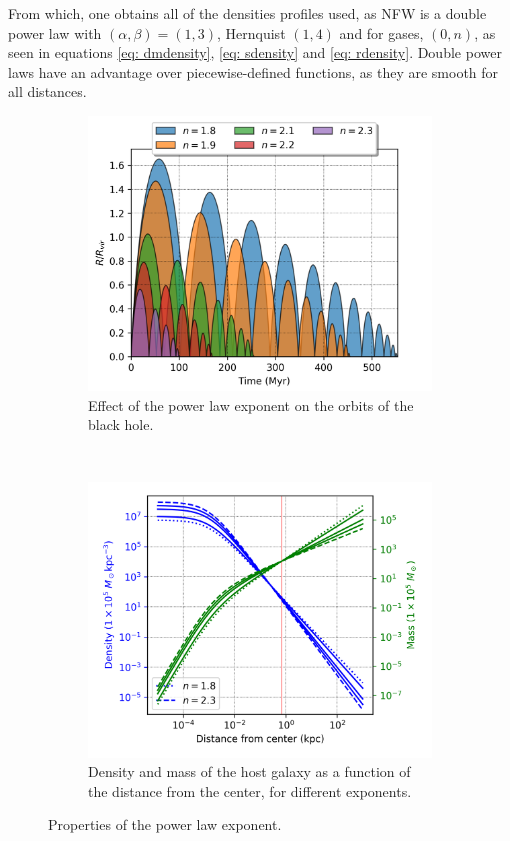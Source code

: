 		From which, one obtains all of the densities profiles used, as NFW is a double power law with $(\alpha, \beta) = (1, 3)$, Hernquist $(1, 4)$ and for gases, $(0, n)$, as seen in equations \ref{eq: dmdensity}, \ref{eq: sdensity} and \ref{eq: rdensity}. Double power laws have an advantage over piecewise-defined functions, as they are smooth for all distances. 		
		\begin{figure}[h]
			\centering
			\begin{subfigure}[t]{0.49\textwidth}
				\includegraphics[width = \textwidth]{"../Files/Week 6/power_law"}
				\caption{Effect of the power law exponent on the orbits of the black hole.}
				\label{fig: powerLawOrbits}
			\end{subfigure}
			~ 
			\begin{subfigure}[t]{0.49\textwidth}
				\includegraphics[width=\textwidth]{"../Files/Week 6/power_law_density"}
				\caption{Density and mass of the host galaxy as a function of the distance from the center, for different exponents.}
				\label{fig: powerLawDensities}
			\end{subfigure}
			\caption{Properties of the power law exponent.}
			\label{fig: powerLaw}
		\end{figure}
	
